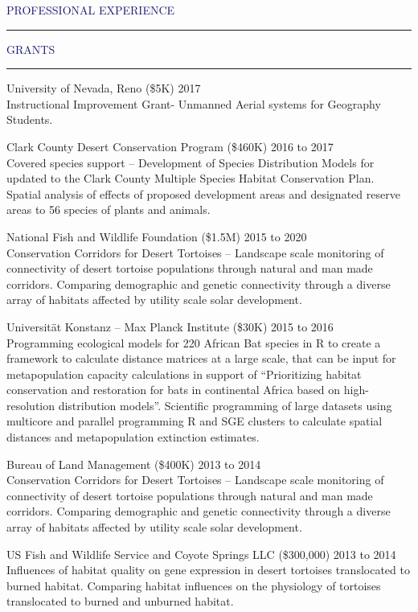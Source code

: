 \documentclass{resume} %
\renewenvironment{rSection}[1]{
\sectionskip
\textcolor{MidnightBlue}{\MakeUppercase{#1}}
\sectionlineskip
\hrule
\begin{list}{}{
\setlength{\leftmargin}{1.5em}
}
\item[]
}{
\end{list}
}
\begin{document}
\begin{rSection}{Professional Experience}
\begin{rSection}{Grants}{}
\item University of Nevada, Reno (\$5K) \hfill 2017  \\
Instructional Improvement Grant- Unmanned Aerial systems for Geography Students.

\item Clark County Desert Conservation Program (\$460K) \hfill 2016 to 2017  \\
Covered species support -- Development of Species Distribution Models for updated to the Clark County Multiple Species Habitat Conservation Plan. Spatial analysis of effects of proposed development areas and designated reserve areas to 56 species of plants and animals.
\item National Fish and Wildlife Foundation (\$1.5M) \hfill 2015 to 2020 \\ 
Conservation Corridors for Desert Tortoises -- Landscape scale monitoring of connectivity of desert tortoise populations through natural and man made corridors. Comparing demographic and genetic connectivity through a diverse array of habitats affected by utility scale solar development.
\item Universität Konstanz -- Max Planck Institute (\$30K) \hfill 2015 to 2016 \\ 
Programming ecological models for 220 African Bat species in R to create a framework to calculate distance matrices at a large scale, that can be input for metapopulation capacity calculations in support of  “Prioritizing habitat conservation and restoration for bats in continental Africa based on high-resolution distribution models”. Scientific programming of large datasets using multicore and parallel programming R and SGE clusters to calculate spatial distances and metapopulation extinction estimates.
\item Bureau of Land Management (\$400K) \hfill 2013 to 2014   \\ 
Conservation Corridors for Desert Tortoises – Landscape scale monitoring of connectivity of desert tortoise populations through natural and man made corridors. Comparing demographic and genetic connectivity through a diverse array of habitats affected by utility scale solar development.
\item US Fish and Wildlife Service and Coyote Springs LLC (\$300,000) \hfill 2013 to 2014 \\ Influences of habitat quality on gene expression in desert tortoises translocated to burned habitat. Comparing habitat influences on the physiology of tortoises translocated to burned and unburned habitat.

\end{rSection}
\end{rSection}
\end{document}
